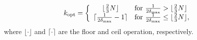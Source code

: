 \begin{equation}
    \label{eq:est_k_opt}
    k_{\text{opt}}=\left\{
      \begin{array}{cl}
        \lfloor\frac{2}{3}N\rfloor
        & \text{for $\frac{1}{2\delta_{\max}}>\lfloor\frac{2}{3}N\rfloor$} \\
        \lceil\frac{1}{2\delta_{\max}}-1\rceil
        & \text{for $\frac{1}{2\delta_{\max}} \leq\lfloor\frac{2}{3}N\rfloor$},
      \end{array}
    \right.
  \end{equation}
where $\lfloor \cdot \rfloor$ and $\lceil \cdot \rceil$ are the floor and ceil operation, respectively.





